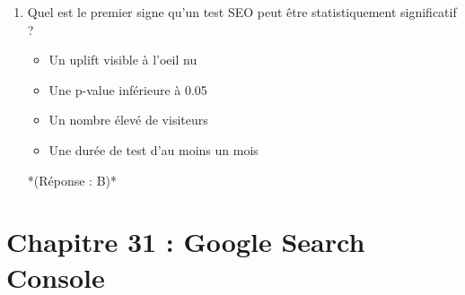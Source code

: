 \documentclass[12pt,a4paper,twoside]{report}
\begin{document}
\begin{enumerate}
    \item Quel est le premier signe qu'un test SEO peut être statistiquement significatif ?
    \begin{itemize}
        \item[A)] Un uplift visible à l'oeil nu
        \item[B)] Une p-value inférieure à 0.05
        \item[C)] Un nombre élevé de visiteurs
        \item[D)] Une durée de test d'au moins un mois
    \end{itemize}
    *(Réponse : B)*
\end{enumerate}
\section*{Chapitre 31 : Google Search Console}
\end{document}
